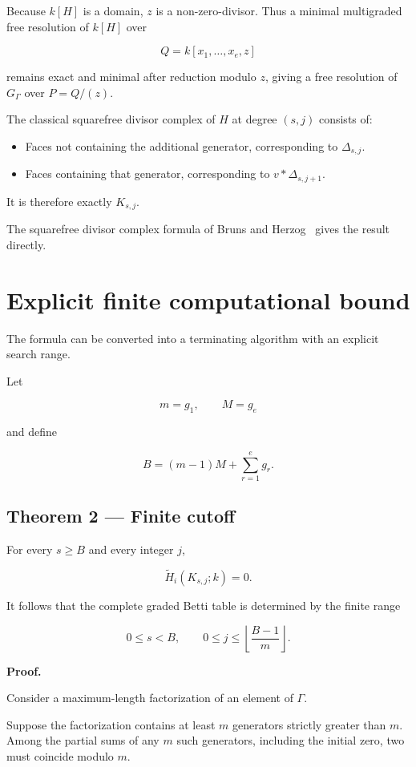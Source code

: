 \documentclass[11pt]{article}
\begin{document}
Because \(k[H]\) is a domain, \(z\) is a non-zero-divisor. Thus a minimal multigraded free resolution of \(k[H]\) over

\[
Q=k[x_1,\ldots,x_e,z]
\]

remains exact and minimal after reduction modulo \(z\), giving a free resolution of \(G_\Gamma\) over \(P=Q/(z)\).

The classical squarefree divisor complex of \(H\) at degree \((s,j)\) consists of:

\begin{itemize}
\item Faces not containing the additional generator, corresponding to \(\Delta_{s,j}\).
\item Faces containing that generator, corresponding to \(v*\Delta_{s,j+1}\).

\end{itemize}
It is therefore exactly \(K_{s,j}\).

The squarefree divisor complex formula of Bruns and Herzog~\cite{BH} gives the result directly.

\section{Explicit finite computational bound}

The formula can be converted into a terminating algorithm with an explicit search range.

Let

\[
m=g_1,\qquad M=g_e
\]

and define

\[
B=(m-1)M+\sum_{r=1}^{e}g_r.
\]

\subsection{Theorem 2 --- Finite cutoff}

For every \(s\ge B\) and every integer \(j\),

\[
\widetilde H_i(K_{s,j};k)=0.
\]

It follows that the complete graded Betti table is determined by the finite range

\[
\boxed{
0\le s<B,\qquad
0\le j\le
\left\lfloor\frac{B-1}{m}\right\rfloor.
}
\]

\textbf{Proof.}

Consider a maximum-length factorization of an element of \(\Gamma\).

Suppose the factorization contains at least \(m\) generators strictly greater than \(m\). Among the partial sums of any \(m\) such generators, including the initial zero, two must coincide modulo \(m\).
\end{document}
